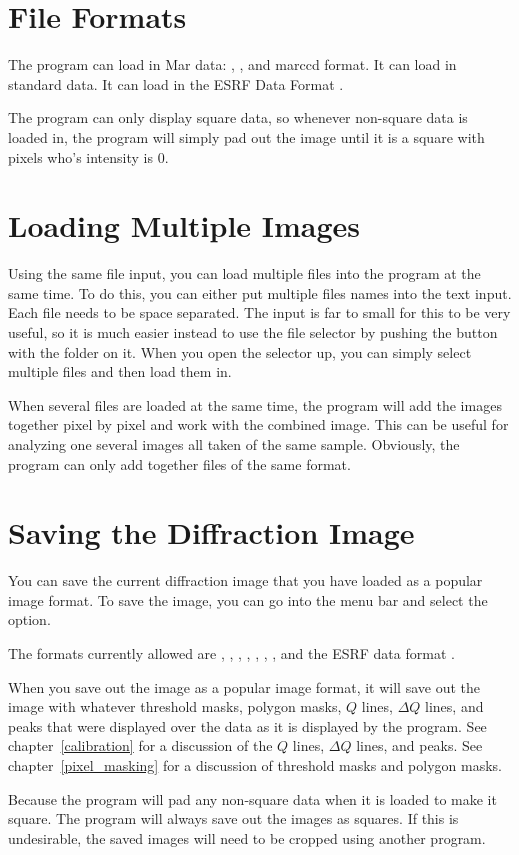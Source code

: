 \section{File Formats}

The program can load in Mar data: , 
, and  marccd format.
It can load in standard  data. 
It can load in the ESRF Data Format 
.

The program can only display square data, so whenever non-square
data is loaded in, the program will simply pad out the image until
it is a square with pixels who's intensity is 0. 


\section{Loading Multiple Images}

Using the same file input, you can load multiple files into 
the program at the same time. To do this, you can either put multiple
files names into the  text input. Each file needs to
be space separated. The input is far to small for this to be very useful,
so it is much easier instead to use the file selector by pushing the
button with the folder on it. When you open the selector up, you can 
simply select multiple files and then load them in.

When several files are loaded at the same time, the program will add
the images together pixel by pixel and work with the combined image.
This can be useful for analyzing one several images all taken of the
same sample. Obviously, the program can only add together files of
the same format.

\section{Saving the Diffraction Image}
You can save the current diffraction image that you have loaded 
as a popular image format. To save the image, you can go into
the  menu bar and select the  option.

The formats currently allowed are , , , 
, , , , and the ESRF data 
format .

When you save out the image as a popular image format, it will 
save out the image with whatever threshold masks, polygon 
masks, $Q$ lines, $\Delta Q$ lines, and peaks that were displayed 
over the data as it is displayed by the program. See 
chapter~\ref{calibration} for a discussion of the $Q$ lines,
$\Delta Q$ lines, and peaks. See chapter~\ref{pixel_masking}
for a discussion of threshold masks and polygon masks.

Because the program will pad any non-square data when
it is loaded to make it square. The program will always save out 
the images as squares. If this is undesirable, the saved images
will need to be cropped using another program.

